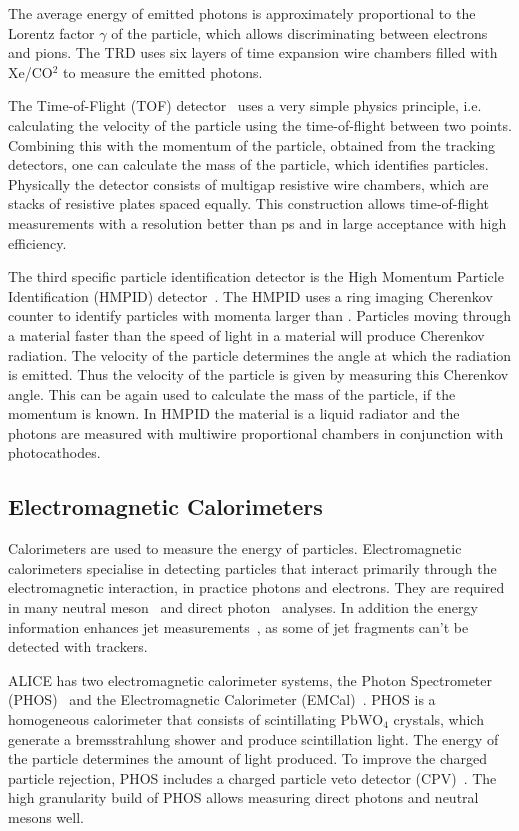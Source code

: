 The average energy of emitted photons is approximately proportional to the Lorentz factor $\gamma$ of the particle, which allows discriminating between electrons and pions. The TRD uses six layers of time expansion wire chambers filled with Xe/CO$^2$ to measure the emitted photons. 

The Time-of-Flight  (TOF) detector~\cite{Dellacasa:2000kh} uses a very simple physics principle, i.e. calculating the velocity of the particle using the time-of-flight between two points. Combining this with the momentum of the particle, obtained from the tracking detectors, one can calculate the mass of the particle, which identifies particles. Physically the detector consists of multigap resistive wire chambers, which are stacks of resistive plates spaced equally. This construction allows time-of-flight measurements with a resolution better than \unit[100]{ps} and in large acceptance with high efficiency.

The third specific particle identification detector is the High Momentum Particle Identification (HMPID) detector~\cite{Beole:1998yq}. The HMPID uses a ring imaging Cherenkov counter to identify particles with momenta larger than \unit[1]{\GeVc}. Particles moving through a material faster than the speed of light in a material will produce Cherenkov radiation. The velocity of the particle determines the angle at which the radiation is emitted. Thus the velocity of the particle is given by measuring this Cherenkov angle. This can be again used to calculate the mass of the particle, if the momentum is known. In HMPID the material is a liquid radiator and the photons are measured with multiwire proportional chambers in conjunction with photocathodes. 




\subsection{Electromagnetic Calorimeters}
\label{sec:emcal}
Calorimeters are used to measure the energy of particles. Electromagnetic calorimeters specialise in detecting particles that interact primarily through the electromagnetic interaction, in practice photons and electrons. They are required in many neutral meson~\cite{Abelev:2012cn} and direct photon~\cite{Adam:2015lda} analyses. In addition the energy information enhances jet measurements~\cite{Reed:2013rpa}, as some of jet fragments can't be detected with trackers.
\setlength{\emergencystretch}{3em}


ALICE has two electromagnetic calorimeter systems, the Photon Spectrometer (PHOS)~\cite{PHOS} and the Electromagnetic Calorimeter (EMCal)~\cite{Cortese:2008zza}. PHOS is a homogeneous calorimeter that consists of scintillating $\mathrm{PbWO_4}$ crystals, which generate a bremsstrahlung  shower and produce scintillation light. The energy of the particle determines the amount of light produced. To improve the charged particle rejection, PHOS includes a charged particle veto detector (CPV)~\cite{PHOS}. The high granularity build of PHOS allows measuring direct photons and neutral mesons well.

